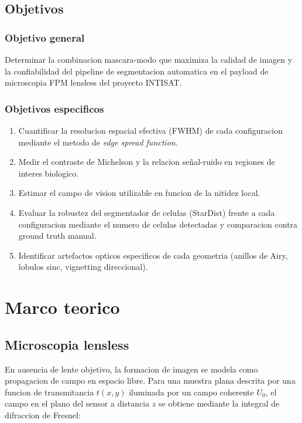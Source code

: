 \documentclass[11pt,a4paper,oneside]{report}
\begin{document}
\section{Objetivos}

\subsection*{Objetivo general}

Determinar la combinacion mascara-modo que maximiza la calidad de imagen
y la confiabilidad del pipeline de segmentacion automatica en el payload
de microscopia FPM lensless del proyecto INTISAT.

\subsection*{Objetivos especificos}

\begin{enumerate}[leftmargin=2.2em]
  \item Cuantificar la resolucion espacial efectiva (FWHM) de cada
        configuracion mediante el metodo de \emph{edge spread function}.
  \item Medir el contraste de Michelson y la relacion señal-ruido
        en regiones de interes biologico.
  \item Estimar el campo de vision utilizable en funcion de la nitidez local.
  \item Evaluar la robustez del segmentador de celulas (StarDist) frente a
        cada configuracion mediante el numero de celulas detectadas y
        comparacion contra ground truth manual.
  \item Identificar artefactos opticos especificos de cada geometria
        (anillos de Airy, lobulos sinc, vignetting direccional).
\end{enumerate}

\chapter{Marco teorico}

\section{Microscopia lensless}

En ausencia de lente objetivo, la formacion de imagen se modela como
propagacion de campo en espacio libre. Para una muestra plana descrita
por una funcion de transmitancia $t(x,y)$ iluminada por un campo coherente
$U_0$, el campo en el plano del sensor a distancia $z$ se obtiene mediante
la integral de difraccion de Fresnel:
\end{document}
